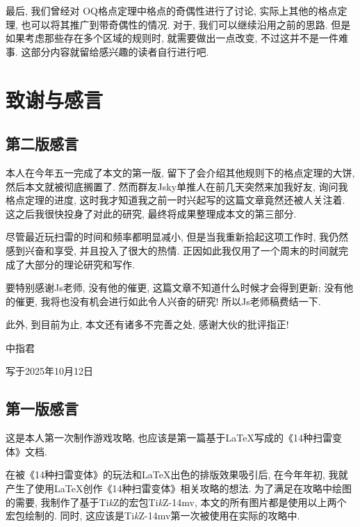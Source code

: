 \documentclass{ctexart}
\newcommand{\varible}[1]{{\Noto[#1]}}
\begin{document}
最后, 我们曾经对 OQ格点定理中格点的奇偶性进行了讨论, 实际上其他的格点定理, 也可以将其推广到带奇偶性的情况.
对于\varible{S}, 我们可以继续沿用之前的思路. 但是如果考虑那些存在多个区域的规则时, 就需要做出一点改变, 不过这并不是一件难事. 这部分内容就留给感兴趣的读者自行进行吧.


\pagebreak

\section{致谢与感言}
\subsection{第二版感言}
本人在今年五一完成了本文的第一版, 留下了会介绍其他规则下的格点定理的大饼, 然后本文就被彻底搁置了. 然而群友Jsky单推人在前几天突然来加我好友, 询问我格点定理的进度, 这时我才知道我之前一时兴起写的这篇文章竟然还被人关注着. 这之后我很快投身了对此的研究, 最终将成果整理成本文的第三部分.

尽管最近玩扫雷的时间和频率都明显减小, 但是当我重新拾起这项工作时, 我仍然感到兴奋和享受, 并且投入了很大的热情. 正因如此我仅用了一个周末的时间就完成了大部分的理论研究和写作.

要特别感谢Js老师, 没有他的催更, 这篇文章不知道什么时候才会得到更新; 没有他的催更, 我将也没有机会进行如此令人兴奋的研究! {\footnotesize \color[rgb]{.7,.7,.7} 所以Js老师稿费结一下.}

此外, 到目前为止, 本文还有诸多不完善之处, 感谢大伙的批评指正!

\begin{flushright}
    中指君

    写于2025年10月12日
\end{flushright}

\pagebreak

\subsection{第一版感言}

这是本人第一次制作游戏攻略, 也应该是第一篇基于\LaTeX 写成的《14种扫雷变体》文档. 

在被《14种扫雷变体》的玩法和\LaTeX 出色的排版效果吸引后, 在今年年初, 我就产生了使用\LaTeX 创作《14种扫雷变体》相关攻略的想法. 为了满足在攻略中绘图的需要, 我制作了基于Ti\emph{k}Z的宏包Ti\emph{k}Z-14mv, 本文的所有图片都是使用以上两个宏包绘制的. 同时, 这应该是Ti\emph{k}Z-14mv第一次被使用在实际的攻略中.
\end{document}
